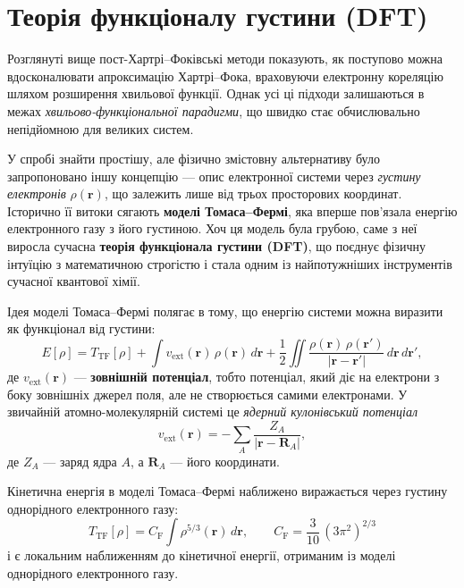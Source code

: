 
\chapter{Теорія функціоналу густини (DFT)}\label{\currfilebase}

Розглянуті вище пост-Хартрі–Фоківські методи показують, як поступово можна вдосконалювати апроксимацію Хартрі–Фока, враховуючи електронну кореляцію шляхом розширення хвильової функції. Однак усі ці підходи залишаються в межах \emph{хвильово-функціональної парадигми}, що швидко стає обчислювально непідйомною для великих систем.

У спробі знайти простішу, але фізично змістовну альтернативу було запропоновано іншу концепцію --- опис електронної системи через \emph{густину електронів} $\rho(\mathbf{r})$, що залежить лише від трьох просторових координат. Історично її витоки сягають \textbf{моделі Томаса–Фермі}, яка вперше пов’язала енергію електронного газу з його густиною. Хоч ця модель була грубою, саме з неї виросла сучасна \textbf{теорія функціонала густини (DFT)}, що поєднує фізичну інтуїцію з математичною строгістю і стала одним із найпотужніших інструментів сучасної квантової хімії.

Ідея моделі Томаса–Фермі полягає в тому, що
енергію системи можна виразити як функціонал від густини:
\[
E[\rho] = T_\text{TF}[\rho]
+ \int v_\text{ext}(\mathbf{r})\,\rho(\mathbf{r})\,d\mathbf{r}
+ \frac{1}{2}\iint
\frac{\rho(\mathbf{r})\,\rho(\mathbf{r}')}{|\mathbf{r}-\mathbf{r}'|}
\,d\mathbf{r}\,d\mathbf{r}' ,
\]
де $v_\text{ext}(\mathbf{r})$ --- \textbf{зовнішній потенціал}, тобто потенціал, який діє на електрони з боку зовнішніх джерел поля, але не створюється самими електронами.
У звичайній атомно-молекулярній системі це \emph{ядерний кулонівський потенціал}
\[
v_\text{ext}(\mathbf{r}) = -\sum_A \frac{Z_A}{|\mathbf{r}-\mathbf{R}_A|},
\]
де $Z_A$ --- заряд ядра $A$, а $\mathbf{R}_A$ --- його координати.

Кінетична енергія в моделі Томаса–Фермі наближено виражається через густину однорідного електронного газу:
\[
T_\text{TF}[\rho]
= C_\text{F}\int \rho^{5/3}(\mathbf{r})\,d\mathbf{r}, \qquad
C_\text{F} = \frac{3}{10}\,(3\pi^2)^{2/3}
\]
і є локальним наближенням до кінетичної енергії, отриманим із моделі однорідного електронного газу.

